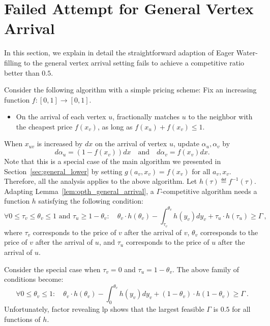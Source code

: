 \section{Failed Attempt for General Vertex Arrival}
\label{app:fail}

In this section, we explain in detail the straightforward adaption of Eager Water-filling to the general vertex arrival setting fails to achieve a competitive ratio better than $0.5$.

Consider the following algorithm with a simple pricing scheme:
Fix an increasing function $f:[0,1] \to [0,1]$.
\begin{itemize}
	\item On the arrival of each vertex $u$, fractionally matches $u$ to the neighbor with the cheapest price $f(x_v)$, as long as $f(x_u) + f(x_v) \le 1$. 
\end{itemize}
When $x_{uv}$ is increased by $dx$ on the arrival of vertex $u$, update $\alpha_u, \alpha_v$ by
\[
d\alpha_u = (1-f(x_v)) dx \quad \text{and} \quad d\alpha_v =f(x_v) dx.
\]
Note that this is a special case of the main algorithm we presented in Section~\ref{sec:general_lower} by setting $g(a_v,x_v) = f(x_v)$ for all $a_v,x_v$.
Therefore, all the analysis applies to the above algorithm. Let $h(\tau) \eqdef f^{-1}(\tau)$.
Adapting Lemma~\ref{lem:opth_general_arrival}, a $\Gamma$-competitive algorithm needs a function $h$ satisfying the following condition:
\[
	\forall 0\le \tau_v \le \theta_v \le 1 \text{ and } \tau_u \ge 1-\theta_v:\quad  \theta_v \cdot h(\theta_v) - \int_{\tau_v}^{\theta_v} h(y_v) dy_v + \tau_u \cdot h(\tau_u) \ge \Gamma~,
\] 
where $\tau_v$ corresponds to the price of $v$ after the arrival of $v$, $\theta_v$ corresponds to the price of $v$ after the arrival of $u$, and $\tau_u$ corresponds to the price of $u$ after the arrival of $u$.

Consider the special case when $\tau_v=0$ and $\tau_u = 1-\theta_v$. The above family of conditions become:
\[
\forall 0\le \theta_v \le 1:\quad  \theta_v \cdot h(\theta_v) - \int_{0}^{\theta_v} h(y_v) dy_v + (1-\theta_v) \cdot h(1-\theta_v) \ge \Gamma~.
\]
Unfortunately, factor revealing lp shows that the largest feasible $\Gamma$ is $0.5$ for all functions of $h$.
